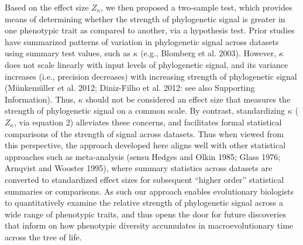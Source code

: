 \documentclass[
]{article}
\begin{document}
Based on the effect size \(Z_\kappa\), we then proposed a two-sample
test, which provides means of determining whether the strength of
phylogenetic signal is greater in one phenotypic trait as compared to
another, via a hypothesis test. Prior studies have summarized patterns
of variation in phylogenetic signal across datasets using summary test
values, such as \(\kappa\) (e.g., Blomberg et al. 2003). However,
\(\kappa\) does not scale linearly with input levels of phylogenetic
signal, and its variance increases (i.e., precision decreases) with
increasing strength of phylogenetic signal (Münkemüller et al. 2012;
Diniz-Filho et al. 2012: see also Supporting Information). Thus,
\(\kappa\) should not be considered an effect size that measures the
strength of phylogenetic signal on a common scale. By contrast,
standardizing \(\kappa\) (\(Z_\kappa\), via equation 2) alleviates these
concerns, and facilitates formal statistical comparisons of the strength
of signal across datasets. Thus when viewed from this perspective, the
approach developed here aligns well with other statistical approaches
such as meta-analysis (sensu Hedges and Olkin 1985; Glass 1976; Arnqvist
and Wooster 1995), where summary statistics across datasets are
converted to standardized effect sizes for subsequent ``higher order''
statistical summaries or comparisons. As such our approach enables
evolutionary biologists to quantitatively examine the relative strength
of phylogenetic signal across a wide range of phenotypic traits, and
thus opens the door for future discoveries that inform on how phenotypic
diversity accumulates in macroevolutionary time across the tree of life.
\hfill\break
\end{document}
